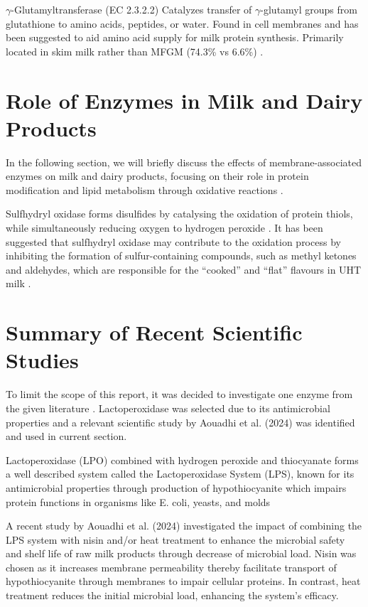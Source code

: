 \vline

$\gamma$-Glutamyltransferase (EC 2.3.2.2) Catalyzes transfer of $\gamma$-glutamyl groups from glutathione to amino acids, peptides, or water. Found in cell membranes and  has been suggested to aid amino acid supply for milk protein synthesis. Primarily located in skim milk rather than MFGM (74.3\% vs 6.6\%) \cite*{RM_01}.

\section{Role of Enzymes in Milk and Dairy Products}

In the following section, we will briefly discuss the effects of membrane-associated enzymes on milk and dairy products, focusing on their role in protein modification and lipid metabolism through oxidative reactions \cite{RM_01}.

\vline

Sulfhydryl oxidase forms disulfides by catalysing the oxidation of protein thiols, while simultaneously reducing oxygen to hydrogen peroxide \cite{RM_01}. It has been suggested that sulfhydryl oxidase may contribute to the oxidation process by inhibiting the formation of sulfur-containing compounds, such as methyl ketones and aldehydes, which are responsible for the “cooked” and “flat” flavours in UHT milk \cite{RM_01}.



\section{Summary of Recent Scientific Studies}
To limit the scope of this report, it was decided to investigate one enzyme from the given literature \cite*{RM_01}. Lactoperoxidase was selected due to its antimicrobial properties and a relevant scientific study by Aouadhi et al. (2024) was identified and used in current section. 

\vline

Lactoperoxidase (LPO) combined with hydrogen peroxide and thiocyanate forms a well described system called the Lactoperoxidase System (LPS), known for its antimicrobial properties through production of hypothiocyanite which impairs protein functions in organisms like E. coli, yeasts, and molds \cite*{RM_02}

\vline

A recent study by Aouadhi et al. (2024) investigated the impact of combining the LPS system with nisin and/or heat treatment to enhance the microbial safety and shelf life of raw milk products through decrease of microbial load. 
Nisin was chosen as it increases membrane permeability thereby facilitate transport of hypothiocyanite through membranes to impair cellular proteins. In contrast, heat treatment reduces the initial microbial load, enhancing the system's efficacy.

